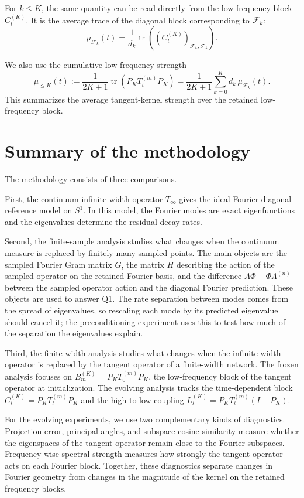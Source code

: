 For \(k\le K\), the same quantity can be read directly from the low-frequency
block \(C_t^{(K)}\). It is the average trace of the diagonal block corresponding
to \(\mathcal F_k\):
\begin{equation}
	\mu_{\mathcal F_k}(t)
	=
	\frac{1}{d_k}
	\operatorname{tr}\!\left((C_t^{(K)})_{\mathcal F_k,\mathcal F_k}\right).
	\label{eq:method-frequency-spectral-strength-block}
\end{equation}

We also use the cumulative low-frequency strength
\begin{equation}
	\mu_{\le K}(t)
	:=
	\frac{1}{2K+1}
	\operatorname{tr}\!\left(P_KT_t^{(m)}P_K\right)
	=
	\frac{1}{2K+1}
	\sum_{k=0}^K d_k\,\mu_{\mathcal F_k}(t).
	\label{eq:method-cumulative-spectral-strength}
\end{equation}
This summarizes the average tangent-kernel strength over the retained
low-frequency block.

\section{Summary of the methodology}

The methodology consists of three comparisons.

First, the continuum infinite-width operator \(T_\infty\) gives the ideal
Fourier-diagonal reference model on \(S^1\). In this model, the Fourier modes
are exact eigenfunctions and the eigenvalues determine the residual decay rates.

Second, the finite-sample analysis studies what changes when the continuum
measure is replaced by finitely many sampled points. The main objects are the
sampled Fourier Gram matrix \(G\), the matrix \(H\) describing the action of
the sampled operator on the retained Fourier basis, and the difference
\(A\Phi-\Phi\Lambda^{(n)}\) between the sampled operator action and the
diagonal Fourier prediction. These objects are used to answer Q1. The rate
separation between modes comes from the spread of eigenvalues, so rescaling
each mode by its predicted eigenvalue should cancel it; the preconditioning
experiment uses this to test how much of the separation the eigenvalues
explain.

Third, the finite-width analysis studies what changes when the infinite-width
operator is replaced by the tangent operator of a finite-width network. The
frozen analysis focuses on \(B_m^{(K)}=P_KT_0^{(m)}P_K\), the low-frequency block
of the tangent operator at initialization. The evolving analysis tracks the
time-dependent block \(C_t^{(K)}=P_KT_t^{(m)}P_K\) and the high-to-low coupling
\(L_t^{(K)}=P_KT_t^{(m)}(I-P_K)\).

For the evolving experiments, we use two complementary kinds of diagnostics.
Projection error, principal angles, and subspace cosine similarity measure
whether the eigenspaces of the tangent operator remain close to the Fourier
subspaces.
Frequency-wise spectral strength measures how strongly the tangent operator
acts on each Fourier block. Together, these diagnostics separate changes in
Fourier geometry from changes in the magnitude of the kernel on the retained
frequency blocks.
